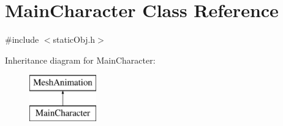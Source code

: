 \hypertarget{class_main_character}{\section{Main\-Character Class Reference}
\label{class_main_character}
}


{\ttfamily \#include $<$static\-Obj.\-h$>$}

Inheritance diagram for Main\-Character\-:\begin{figure}[H]
\begin{center}
\leavevmode
\includegraphics[height=2.000000cm]{class_main_character}
\end{center}
\end{figure}
